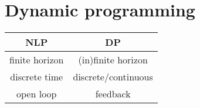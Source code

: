 \section{Dynamic programming}
\begin{center}
    \begin{tabu} to \columnwidth{cc}
        \toprule
        \textbf{NLP}     & \textbf{DP}\\
        \midrule
        finite horizon    & (in)finite horizon\\
        discrete time    & discrete/continuous\\
        open loop        & feedback\\
        \bottomrule
    \end{tabu}
\end{center}







\cleardoublepage
